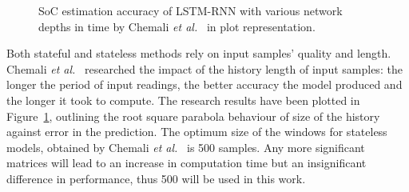 %
\begin{figure}[ht]
    \centering
    
    \caption{SoC estimation accuracy of LSTM-RNN with various network depths in time by Chemali \textit{et al.}~\cite{Chemali2017} in plot representation.}
    \label{fig:chemali-accuracy}
\end{figure}
 {
    
} {
    Both stateful and stateless methods rely on input samples' quality and length.
    Chemali \textit{et al.}~\cite{Chemali2017} researched the impact of the history length of input samples: the longer the period of input readings, the better accuracy the model produced and the longer it took to compute.
    The research results have been plotted in \mbox{Figure~\ref{fig:chemali-accuracy}}, outlining the root square parabola behaviour of size of the history against error in the prediction.
    The optimum size of the windows for stateless models, obtained by Chemali \textit{et al.}~\cite{Chemali2017} is 500 samples.
    Any more significant matrices will lead to an increase in computation time but an insignificant difference in performance, thus 500 will be used in this work.
}

